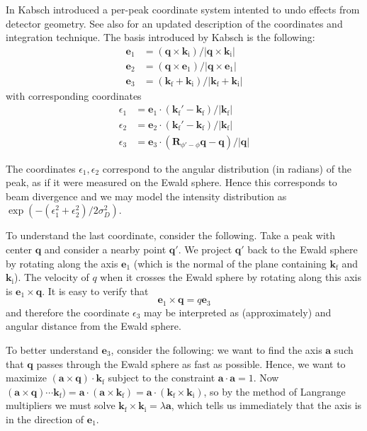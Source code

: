 \documentclass[11pt,a4paper]{article}
\def\v#1{\bm{{#1}}}
\def\si{\text{i}}
\def\sf{\text{f}}
\def\ba{\v{a}}
\def\be{{\v{e}}}
\def\k{{\v{k}}}
\def\q{{\v{q}}}
\begin{document}
In \cite{Kab88} Kabsch introduced a per-peak coordinate system intented to undo effects from detector geometry.
See also \cite{Kab10b} for an updated description of the coordinates and integration technique.
The basis introduced by Kabsch is the following:
\begin{align}
  \be_1 &= (\q \times \k_\si) / |\q \times \k_\si| \\
  \be_2 &= (\q \times \be_1) / |\q \times \be_1| \\
  \be_3 &= (\k_\sf + \k_\si) / |\k_\sf + \k_\si|
\end{align}
with corresponding coordinates
\begin{align}
  \epsilon_1 &= \be_1 \cdot (\k_\sf'-\k_\sf) / |\k_\sf| \\
  \epsilon_2 &= \be_2 \cdot (\k_\sf'-\k_\sf) / |\k_\sf| \\
  \epsilon_3 &= \be_3 \cdot (\v{R}_{\phi'-\phi}\q-\q) / |\q|
\end{align}

The coordinates $\epsilon_1, \epsilon_2$ correspond to the angular distribution (in radians) of the peak, as if it were measured on the Ewald sphere. Hence this corresponds to beam divergence and we may model the intensity distribution as $\exp(-(\epsilon_1^2 + \epsilon_2^2)/2 \sigma_D^2)$.

To understand the last coordinate, consider the following. Take a peak with center $\q$ and consider a nearby point $\q'$. We project $\q'$ back to the Ewald sphere by rotating along the axis $\be_1$ (which is the normal of the plane containing $\k_\sf$ and $\k_\si$). The velocity of $q$ when it crosses the Ewald sphere by rotating along this axis is $\be_1 \times \q$. It is easy to verify that
\begin{equation} \be_1 \times \q = q \be_3 \end{equation}
and therefore the coordinate $\epsilon_3$ may be interpreted as (approximately) and angular distance from the Ewald sphere.

To better understand $\be_3$, consider the following: we want to find the axis $\ba$ such that $\q$ passes through the Ewald sphere as fast as possible. Hence, we want to maximize $(\ba \times \q) \cdot \k_\sf$ subject to the constraint $\ba \cdot \ba = 1$.
Now $(\ba \times \q) \cdots \k_\sf) = \ba \cdot (\ba \times \k_\sf) = \ba \cdot (\k_\sf \times \k_\si)$, so by the method of Langrange multipliers we must solve $\k_\sf \times \k_\si = \lambda \ba$, which tells us immediately that the axis is in the direction of $\be_1$.
\end{document}
